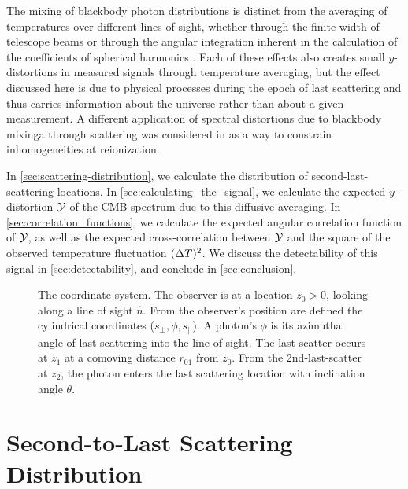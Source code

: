 \documentclass[fleqn,usenatbib]{mnras}
\begin{document}
    The mixing of blackbody photon distributions is distinct from the averaging
    of temperatures over different lines of sight, whether through the finite
    width of telescope beams \cite[e.g.][]{ChlubaSunyaev2004} or through the
    angular integration inherent in the calculation of the coefficients of
    spherical harmonics \cite[e.g.][]{Chluba+2017,Lucca+2020}.  Each of these
    effects also creates small $y$-distortions in measured signals through
    temperature averaging, but the effect discussed here is due to physical
    processes during the epoch of last scattering and thus carries information
    about the universe rather than about a given measurement.  A different
    application of spectral distortions due to blackbody mixinga through
    scattering was considered in \cite{CaldwellStebbins2008} as a way to
    constrain inhomogeneities at reionization.

    In \autoref{sec:scattering-distribution}, we calculate the distribution of
    second-last-scattering locations.  In \autoref{sec:calculating_the_signal},
    we calculate the expected $y$-distortion $\mathcal{Y}$ of the CMB spectrum due to
    this diffusive averaging.  In \autoref{sec:correlation_functions}, we
    calculate the expected angular correlation function of $\mathcal{Y}$, as well as the
    expected cross-correlation between $\mathcal{Y}$ and the square of the observed
    temperature fluctuation $({\Delta T})^2$.  We discuss the detectability of this
    signal in \autoref{sec:detectability}, and conclude in
    \autoref{sec:conclusion}.

    \begin{figure*}
        
        \caption{%
            The coordinate system. The observer is at a location $z_0 > 0$,
            looking along a line of sight $\hat{n}$. From the observer's
            position are defined the cylindrical coordinates ($s_{\perp}, \phi,
            s_{||}$). A photon's $\phi$ is its azimuthal angle of last
            scattering into the line of sight. The last scatter occurs at $z_1$
            at a comoving distance $r_{01}$ from $z_0$. From the
            2nd-last-scatter at $z_2$, the photon enters the last scattering
            location with inclination angle $\theta$.
        }
        \label{fig:coordinate_system}
    \end{figure*}



\section{Second-to-Last Scattering Distribution}
\label{sec:scattering-distribution}
\end{document}
